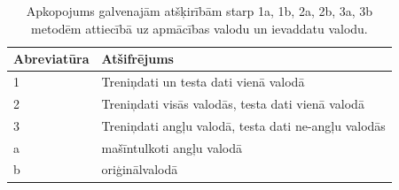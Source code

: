 

\begin{table}[htbp]
  \centering
  \caption{Apkopojums galvenajām atšķirībām starp 1a, 1b, 2a, 2b, 3a, 3b metodēm attiecībā uz apmācības valodu un ievaddatu valodu.}
    \begin{tabular}{ll}\toprule
    Abreviatūra & Atšifrējums \\\midrule
    1 & Treniņdati un testa dati vienā valodā \\
    2 & Treniņdati visās valodās, testa dati vienā valodā \\
    3 & Treniņdati angļu valodā, testa dati ne-angļu valodās \\\midrule
    a & mašīntulkoti angļu valodā \\
    b & oriģinālvalodā \\\bottomrule
    \end{tabular}%
  \label{tab:legend}%
\end{table}%


